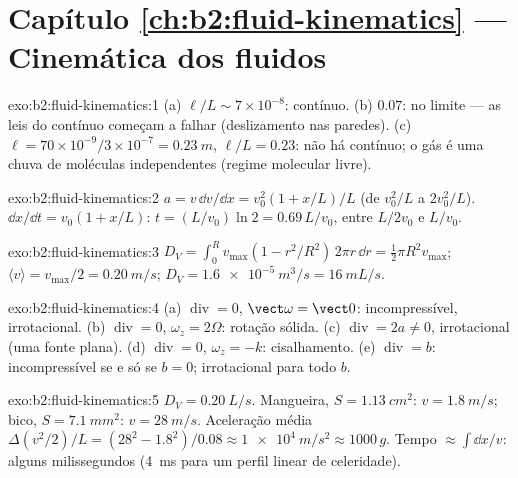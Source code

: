 \section*{Capítulo \ref{ch:b2:fluid-kinematics} --- Cinemática dos fluidos}

\begin{solution}{exo:b2:fluid-kinematics:1}
(a) $\ell/L \sim 7 \times 10^{-8}$: contínuo. (b) $0.07$: no limite --- as
leis do contínuo começam a falhar (deslizamento nas paredes). (c) $\ell = 70 \times 10^{-9}
/3 \times 10^{-7} = \qty{0.23}{m}$, $\ell/L = 0.23$: não há contínuo; o gás é
uma chuva de moléculas independentes (regime molecular livre).
\end{solution}

\begin{solution}{exo:b2:fluid-kinematics:2}
$a = v\,\dd v/\dd x = v_0^2(1 + x/L)/L$ (de $v_0^2/L$ a $2v_0^2/L$).
$\dd x/\dd t = v_0(1 + x/L)$: $t = (L/v_0)\ln2 = 0.69\,L/v_0$, entre
$L/2v_0$ e $L/v_0$.
\end{solution}

\begin{solution}{exo:b2:fluid-kinematics:3}
$D_V = \int_0^Rv_{\max}(1 - r^2/R^2)\,2\pi r\,\dd r = \tfrac12\pi R^2v_{\max}$;
$\langle v\rangle = v_{\max}/2 = \qty{0.20}{m/s}$; $D_V = \qty{1.6e-5}{m^3/s} =
\qty{16}{mL/s}$.
\end{solution}

\begin{solution}{exo:b2:fluid-kinematics:4}
(a) $\operatorname{div} = 0$, $\vect\omega = \vect 0$: incompressível,
irrotacional. (b) $\operatorname{div} = 0$, $\omega_z = 2\Omega$: rotação
sólida. (c) $\operatorname{div} = 2a \ne 0$, irrotacional (uma fonte
plana). (d) $\operatorname{div} = 0$, $\omega_z = -k$: cisalhamento. (e)
$\operatorname{div} = b$: incompressível se e só se $b = 0$; irrotacional para
todo $b$.
\end{solution}

\begin{solution}{exo:b2:fluid-kinematics:5}
$D_V = \qty{0.20}{L/s}$. Mangueira, $S = \qty{1.13}{cm^2}$: $v = \qty{1.8}{m/s}$; bico,
$S = \qty{7.1}{mm^2}$: $v = \qty{28}{m/s}$. Aceleração média $\Delta(v^2/2)/L
= (28^2 - 1.8^2)/0.08 \approx \qty{1e4}{m/s^2} \approx 1000\,g$. Tempo $\approx
\int\dd x/v$: alguns milissegundos (\qty{4}{ms} para um perfil linear de celeridade).
\end{solution}

